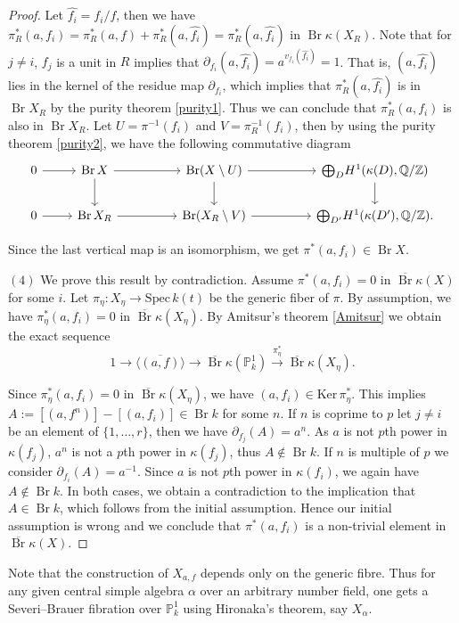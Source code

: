 \documentclass[11pt]{amsart}
\theoremstyle{plain}
\theoremstyle{definition}
\newcommand{\Q}{{\mathbb Q}}
\newcommand{\Z}{{\mathbb Z}}
\DeclareMathOperator{\Br}{Br}
\begin{document}
\begin{proof}
        Let $\hat{f_i}=f_i/f$, then we have $\pi_R^{*}(a,f_i)=\pi_R^{*}(a,f)+\pi_R^{*}(a,\hat{f_i})=\pi_R^{*}(a,\hat{f_i})$ in $\Br \kappa(X_R)$. Note that for $j\neq i$, $f_j$ is a unit in $R$ implies that \( \partial_{f_i}(a, \hat{f_i}) = a^{v_{f_i}(\hat{f_i})}=1 \). That is, \( (a, \hat{f_i}) \) lies in the kernel of the residue map \( \partial_{f_i}\), which implies that \( \pi_R^{*}(a, \hat{f_i}) \) is in \( \Br X_R \) by the purity theorem \ref{purity1}. Thus we can conclude that \( \pi_R^{*}(a, f_i) \) is also in \( \Br X_R \). Let $U=\pi^{-1}(f_i)$ and $V=\pi_R^{-1}(f_i)$, then by
        using the purity theorem \ref{purity2}, we have the following commutative diagram
		$$\begin{tikzcd}
			0 \arrow[r] & {\Br X} \arrow[rr] \arrow[d] &  & {\Br (X\setminus U)} \arrow[d] \arrow[rr] &  & {\bigoplus}_D{H^1(\kappa(D),\Q/\Z)} \arrow[d] \\
			0 \arrow[r] & {\Br X_R} \arrow[rr]         &  & {\Br (X_R\setminus V)} \arrow[rr]       &  & {\bigoplus}_{D'}{H^1(\kappa(D') ,\Q/\Z)}.          
		\end{tikzcd}$$
		
		Since the last vertical map is an isomorphism, we get $\pi^{*}(a, f_i) \in \Br X $. 
		
		$(4)$ We prove this result by contradiction. Assume \( \pi^{*}(a,f_i) = 0 \) in \( \overline{\Br}\kappa(X) \) for some $i$. Let $\pi_{\eta}:X_{\eta}\rightarrow\text{Spec}\,k(t)$ be the generic fiber of $\pi$. By assumption, we have \( \pi_{\eta}^{*}(a,f_i) = 0 \) in \( \overline{\Br}\kappa(X_{\eta}) \). By Amitsur's theorem \ref{Amitsur} we obtain the exact sequence
		\[
		1 \rightarrow \overline{\langle (a,f) \rangle} \rightarrow \overline{\Br} \kappa(\mathbb{P}^1_k) \xrightarrow{\pi_{\eta}^{*}} \overline{\Br}\kappa(X_{\eta}).
		\]
		
		Since \( \pi_{\eta}^{*}(a,f_i) = 0 \) in \( \overline{\Br}\kappa(X_{\eta})\), we have $(a,f_i)\in \text{Ker}\,\pi_{\eta}^*$. This implies $A:=[(a,f^n)]-[(a,f_i)]\in \Br k$ for some $n$. If $n$ is coprime to $p$ let $j \neq i$ be an element of $\{1, \dots, r\}$, then we have $\partial_{f_j}(A)=a^n$. As $a$ is not $p$th power in $\kappa(f_j)$, $a^n$ is not a $p$th power in $\kappa(f_j)$, thus $A\notin\Br k$. If $n$ is multiple of $p$ we consider $\partial_{f_i}(A)=a^{-1}$. Since $a$ is not $p$th power in $\kappa(f_i)$, we again have $A\notin\Br k$. In both cases, we obtain a contradiction to the implication that \( A\in \Br k \), which follows from the initial assumption. Hence our initial assumption is wrong and we conclude that $\pi^{*}(a,f_i)$ is a non-trivial element in $\overline{\Br}\kappa(X)$.
	\end{proof}
    Note that the construction of $X_{a,f}$ depends only on the generic fibre. Thus for any given central simple algebra $\alpha$ over an arbitrary number field, one gets a Severi--Brauer fibration over $\mathbb{P}^1_k$ using Hironaka's theorem, say $X_\alpha$.
\end{document}
